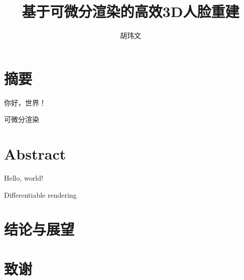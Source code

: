 \documentclass{scutmaster}
\title{基于可微分渲染的高效3D人脸重建}
\author{胡玮文}
\begin{document}
\maketitle
\maketitleEN
\nominationpage
\declareoforiginality

\frontmatter
\chapter{摘要}

你好，世界！

 可微分渲染

\chapter{Abstract}

Hello, world!

 Differentiable rendering

\tableofcontents

\listoffigures

\mainmatter










\chapter{结论与展望}
\label{chap:conclusion}

\backmatter


\chapter{致谢}
\end{document}
